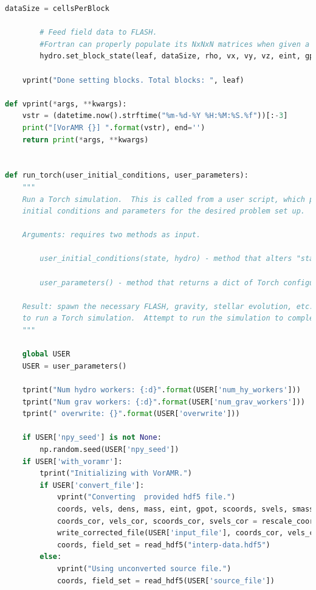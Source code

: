 \documentclass[twoside]{drexel-thesis}
\begin{document}
\begin{lstlisting}[language=python]
        dataSize = cellsPerBlock
        
        # Feed field data to FLASH.
        #Fortran can properly populate its NxNxN matrices when given a 1xN^3 matrix
        hydro.set_block_state(leaf, dataSize, rho, vx, vy, vz, eint, gpot)
        
    vprint("Done setting blocks. Total blocks: ", leaf)

def vprint(*args, **kwargs):
    vstr = (datetime.now().strftime("%m-%d-%Y %H:%M:%S.%f"))[:-3]
    print("[VorAMR {}] ".format(vstr), end='')
    return print(*args, **kwargs)


def run_torch(user_initial_conditions, user_parameters):
    """
    Run a Torch simulation.  This is called from a user script, which provides
    initial conditions and parameters for the desired problem set up.

    Arguments: requires two methods as input.

        user_initial_conditions(state, hydro) - method that alters "state", "hydro" objects to set initial conditions for simulation.

        user_parameters() - method that returns a dict of Torch configuration parameters

    Result: spawn the necessary FLASH, gravity, stellar evolution, etc. workers
    to run a Torch simulation.  Attempt to run the simulation to completion.
    """

    global USER
    USER = user_parameters()

    tprint("Num hydro workers: {:d}".format(USER['num_hy_workers']))
    tprint("Num grav workers: {:d}".format(USER['num_grav_workers']))
    tprint(" overwrite: {}".format(USER['overwrite']))

    if USER['npy_seed'] is not None:
        np.random.seed(USER['npy_seed'])
    if USER['with_voramr']:
        tprint("Initializing with VorAMR.")
        if USER['convert_file']:
            vprint("Converting  provided hdf5 file.")
            coords, vels, dens, mass, eint, gpot, scoords, svels, smass, sinitmass, sfmtime, smet = extract_data(USER['source_file'], apply_consts=True)
            coords_cor, vels_cor, scoords_cor, svels_cor = rescale_coords_vels(coords, vels, mass, scoords, svels, use_com_coords=False)
            write_corrected_file(USER['input_file'], coords_cor, vels_cor, dens, mass, eint, gpot, scoords_cor, svels_cor, smass, sinitmass, sfmtime, smet, USER['use_localRef'], USER['local_ref'], USER['center_local_ref'])
            coords, field_set = read_hdf5("interp-data.hdf5")
        else:
            vprint("Using unconverted source file.")
            coords, field_set = read_hdf5(USER['source_file'])


\end{lstlisting}
\end{document}
